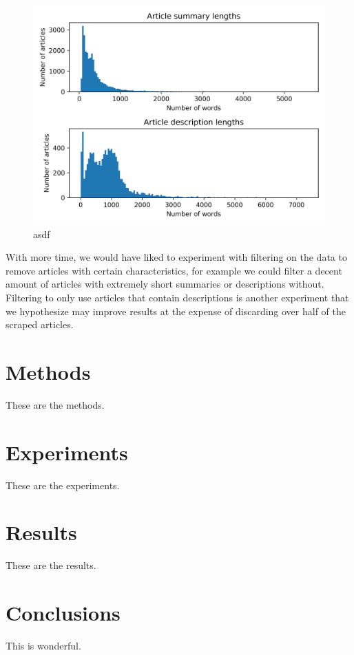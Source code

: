 \documentclass[10pt,twocolumn,letterpaper]{article}
\begin{document}
\begin{figure}
  \includegraphics[width=\linewidth]{article_lengths.png}
  \caption{asdf}
  \label{fig:article_lengths}
\end{figure}

With more time, we would have liked to experiment with filtering on the data to remove articles with certain characteristics, for example we could filter a decent amount of articles with extremely short summaries or descriptions without. Filtering to only use articles that contain descriptions is another experiment that we hypothesize may improve results at the expense of discarding over half of the scraped articles. 

\section{Methods}
\label{section:methods}

These are the methods.

\section{Experiments}

These are the experiments.

\section{Results}

These are the results.

\section{Conclusions}

This is wonderful.

{\small


}
\end{document}
